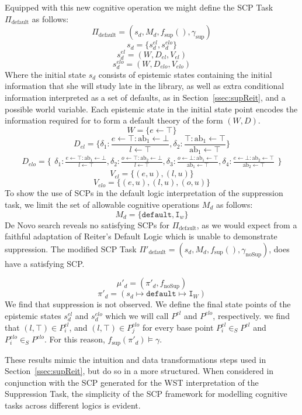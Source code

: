 Equipped with this new cognitive operation we might define the SCP Task $\Pi_\text{default}$ as follows:
\[\Pi_\text{default}=(s_d,M_d,f_\text{sup}(),\gamma_\text{sup})\]
\[s_d=\{s_d^{el}, s_d^{elo}\}\]
\[s_d^{el}=(W,D_{el},V_{el})\]
\[s_d^{elo}=(W,D_{elo},V_{elo})\]
Where the initial state $s_d$ consists of epistemic states containing the initial information that she will study late in the library, as well as extra conditional information interpreted as a set of defaults, as in Section~\ref{ssec:supReit}, and a possible world variable. Each epistemic state in the initial state point encodes the information required for to form a default theory of the form $(W,D)$.
\[W=\{e\leftarrow \top\}\]
\[
D_{el}=\{\delta_1:\frac{e\leftarrow \top:\text{ab}_1 \leftarrow \bot}{l\leftarrow\top} ,
\delta_2:\frac{\top:\text{ab}_1 \leftarrow \top}{\text{ab}_1\leftarrow\top}
\}
\]
\[
D_{elo}=\{\begin{matrix}\delta_1:\frac{e\leftarrow \top:\text{ab}_1 \leftarrow \bot}{l\leftarrow\top} ,
\delta_2:\frac{o\leftarrow \top:\text{ab}_2 \leftarrow \bot}{l\leftarrow\top},
\delta_3:\frac{o\leftarrow \bot:\text{ab}_1 \leftarrow \top}{\text{ab}_1\leftarrow\top},
\delta_4:\frac{e\leftarrow \bot:\text{ab}_2 \leftarrow \top}{\text{ab}_2\leftarrow\top}
\end{matrix}\}
\]
\[V_{el}=\{(e,u),(l,u)\}\]
\[V_{elo}=\{(e,u),(l,u), (o,u)\}\]
To show the use of SCPs in the default logic interpretation of the suppression task, we limit the set of allowable cognitive operations $M_d$ as follows:
\[M_d=\{\texttt{default},\texttt{I}_w\}\]
De Novo search reveals no satisfying SCPs for $\Pi_\text{default}$, as we would expect from a faithful adaptation of Reiter's Default Logic which is unable to demonstrate suppression. The modified SCP Task $\Pi'_\text{default}=(s_d,M_d,f_\text{sup}(),\gamma_\text{noSup})$, does have a satisfying SCP.

\[\mu'_d=(\pi'_d, f_\text{noSup})\]
\[\pi'_d=(s_d \longmapsto \texttt{default} \longmapsto \texttt{I}_W)\]
We find that suppression is not observed. We define the final state points of the epistemic states $s_d^{el}$ and $s_d^{elo}$ which we will call $P^{el}$ and $P^{elo}$, respectively. we find that $(l, \top) \in P^{el}_i$, and $(l, \top) \in P^{elo}_j$ for every base point $P^{el}_i \in_S P^{el}$ and $P^{elo}_i \in_S P^{elo}$. For this reason, $f_\text{sup}(\pi'_d) \models \gamma$. 

These results mimic the intuition and data transformations steps used in Section~\ref{ssec:supReit}, but do so in a more structured. When considered in conjunction with the SCP generated for the WST interpretation of the Suppression Task, the simplicity of the SCP framework for modelling cognitive tasks across different logics is evident.

